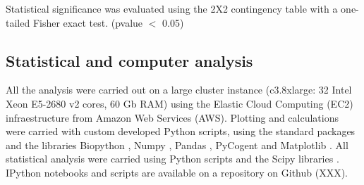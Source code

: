 \begin{center}
\end{center}

Statistical significance was evaluated using the 2X2 contingency table with a one-tailed Fisher exact test. (pvalue $<$ 0.05)


\subsection{Statistical and computer analysis}

All the analysis were carried out on a large cluster instance (c3.8xlarge: 32 Intel Xeon E5-2680 v2 cores, 60 Gb RAM) using the Elastic Cloud Computing (EC2) infraestructure from Amazon Web Services (AWS). Plotting and calculations were carried with custom developed Python scripts, using the standard packages and the libraries Biopython \cite{Cock:2009hj}, Numpy \cite{Oliphant:2007ud} , Pandas \cite{mckinney-proc-scipy-2010}, PyCogent \cite{Knight:2007gp} and Matplotlib \cite{Hunter:2007ih}. All statistical analysis were carried using Python scripts and the Scipy libraries \cite{Oliphant:2007ud}. IPython notebooks \cite{Perez:2007wf} and scripts are available on a repository on Github (XXX).


